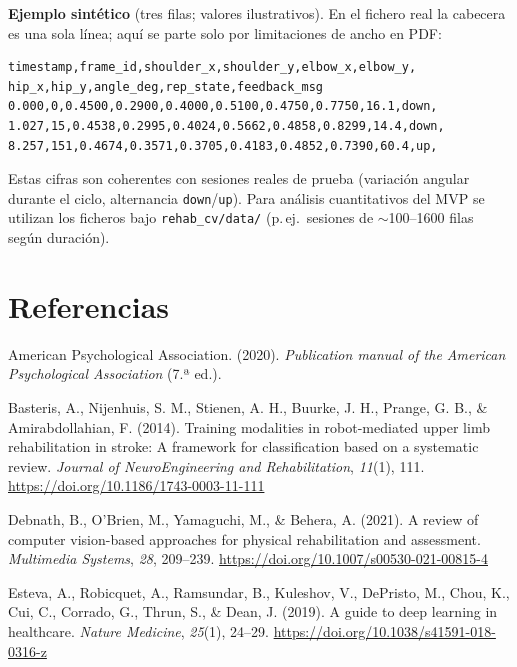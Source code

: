 \documentclass[11pt,a4paper]{article}
\begin{document}
\vspace{0.5em}
\noindent\textbf{Ejemplo sintético} (tres filas; valores ilustrativos). En el fichero real la cabecera es una sola línea; aquí se parte solo por limitaciones de ancho en PDF:

{\footnotesize
\begin{verbatim}
timestamp,frame_id,shoulder_x,shoulder_y,elbow_x,elbow_y,
hip_x,hip_y,angle_deg,rep_state,feedback_msg
0.000,0,0.4500,0.2900,0.4000,0.5100,0.4750,0.7750,16.1,down,
1.027,15,0.4538,0.2995,0.4024,0.5662,0.4858,0.8299,14.4,down,
8.257,151,0.4674,0.3571,0.3705,0.4183,0.4852,0.7390,60.4,up,
\end{verbatim}
}

\noindent Estas cifras son coherentes con sesiones reales de prueba (variación angular durante el ciclo, alternancia \texttt{down}/\texttt{up}). Para análisis cuantitativos del MVP se utilizan los ficheros bajo \texttt{rehab\_cv/data/} (p.\,ej.\ sesiones de $\sim$100--1600 filas según duración).

\clearpage
\section*{Referencias}

\noindent American Psychological Association. (2020). \textit{Publication manual of the American Psychological Association} (7.ª ed.).

\noindent Basteris, A., Nijenhuis, S. M., Stienen, A. H., Buurke, J. H., Prange, G. B., \& Amirabdollahian, F. (2014). Training modalities in robot-mediated upper limb rehabilitation in stroke: A framework for classification based on a systematic review. \textit{Journal of NeuroEngineering and Rehabilitation}, \textit{11}(1), 111. \url{https://doi.org/10.1186/1743-0003-11-111}

\noindent Debnath, B., O'Brien, M., Yamaguchi, M., \& Behera, A. (2021). A review of computer vision-based approaches for physical rehabilitation and assessment. \textit{Multimedia Systems}, \textit{28}, 209--239. \url{https://doi.org/10.1007/s00530-021-00815-4}

\noindent Esteva, A., Robicquet, A., Ramsundar, B., Kuleshov, V., DePristo, M., Chou, K., Cui, C., Corrado, G., Thrun, S., \& Dean, J. (2019). A guide to deep learning in healthcare. \textit{Nature Medicine}, \textit{25}(1), 24--29. \url{https://doi.org/10.1038/s41591-018-0316-z}
\end{document}
